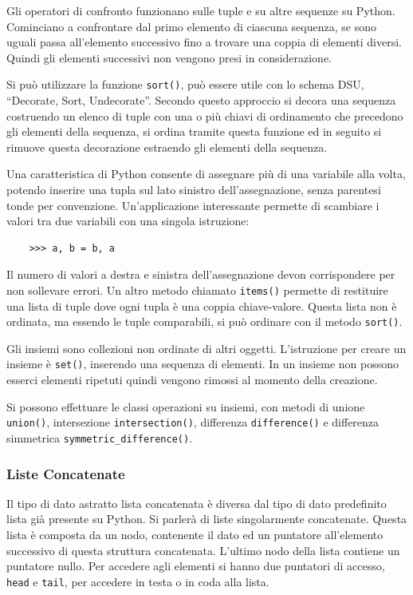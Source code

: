 \documentclass{article}
\numberwithin{equation}{subsection}
\begin{document}
Gli operatori di confronto funzionano sulle tuple e su altre sequenze su Python. Cominciano a confrontare dal primo elemento 
di ciascuna sequenza, se sono uguali passa all'elemento successivo fino a trovare una coppia di elementi diversi. Quindi gli 
elementi successivi non vengono presi in considerazione. 

Si può utilizzare la funzione \verb|sort()|, può essere utile con lo schema DSU, ``Decorate, Sort, Undecorate''. Secondo questo 
approccio si decora una sequenza costruendo un elenco di tuple con una o più chiavi di ordinamento che precedono gli elementi 
della sequenza, si ordina tramite questa funzione ed in seguito si rimuove questa decorazione estraendo gli elementi della 
sequenza. 

Una caratteristica di Python consente di assegnare più di una variabile alla volta, potendo inserire una 
tupla sul lato sinistro dell'assegnazione, senza parentesi tonde per convenzione. 
Un'applicazione interessante permette di scambiare i valori tra due variabili con una singola istruzione:
\begin{verbatim}
    >>> a, b = b, a
\end{verbatim}

Il numero di valori a destra e sinistra dell'assegnazione devon corrispondere per non sollevare errori. 
Un altro metodo chiamato \verb|items()| permette di restituire una lista di tuple dove ogni tupla è una coppia 
chiave-valore. Questa lista non è ordinata, ma essendo le tuple comparabili, si può ordinare con il metodo \verb|sort()|. 


Gli insiemi sono collezioni non ordinate di altri oggetti. L'istruzione per creare un insieme è \verb|set()|, inserendo 
una sequenza di elementi. In un insieme non possono esserci elementi ripetuti quindi vengono rimossi 
al momento della creazione. 

Si possono effettuare le classi operazioni su insiemi, con metodi di unione \verb|union()|, 
intersezione \verb|intersection()|, differenza \verb|difference()| e differenza simmetrica \verb|symmetric_difference()|. 

\subsubsection{Liste Concatenate}
\label{sec:liste_concatenate}

Il tipo di dato astratto lista concatenata è diversa dal tipo di dato predefinito lista già presente su Python. Si parlerà di 
liste singolarmente concatenate. Questa lista è composta da un nodo, contenente il dato ed un puntatore all'elemento successivo 
di questa struttura concatenata. L'ultimo nodo della lista contiene un puntatore nullo. Per accedere agli elementi si hanno 
due puntatori di accesso, \verb|head| e \verb|tail|, per accedere in testa o in coda alla lista. 
\end{document}
